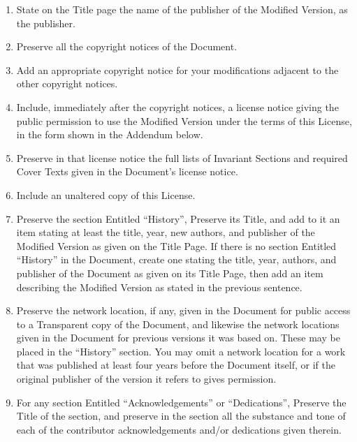 \begin{enumerate}
\begin{enumerate}
  \item
    State on the Title page the name of the publisher of the Modified
    Version, as the publisher.

  \item
    Preserve all the copyright notices of the Document.

  \item
    Add an appropriate copyright notice for your modifications
    adjacent to the other copyright notices.

  \item
    Include, immediately after the copyright notices, a license notice
    giving the public permission to use the Modified Version under the
    terms of this License, in the form shown in the Addendum below.

  \item
    Preserve in that license notice the full lists of Invariant
    Sections and required Cover Texts given in the Document's license
    notice.

  \item
    Include an unaltered copy of this License.

  \item
    Preserve the section Entitled ``History'', Preserve its Title, and
    add to it an item stating at least the title, year, new authors,
    and publisher of the Modified Version as given on the Title Page.
    If there is no section Entitled ``History'' in the Document,
    create one stating the title, year, authors, and publisher of the
    Document as given on its Title Page, then add an item describing
    the Modified Version as stated in the previous sentence.

  \item
    Preserve the network location, if any, given in the Document for
    public access to a Transparent copy of the Document, and likewise
    the network locations given in the Document for previous versions
    it was based on.  These may be placed in the ``History'' section.
    You may omit a network location for a work that was published at
    least four years before the Document itself, or if the original
    publisher of the version it refers to gives permission.

  \item
    For any section Entitled ``Acknowledgements'' or ``Dedications'',
    Preserve the Title of the section, and preserve in the section all
    the substance and tone of each of the contributor acknowledgements
    and/or dedications given therein.


\end{enumerate}
\end{enumerate}
